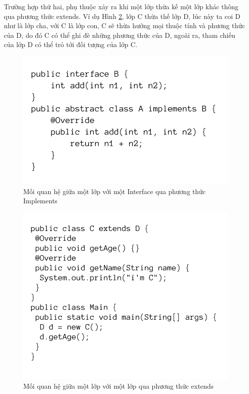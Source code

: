 \documentclass[12pt]{report}
\begin{document}
\noindent Trường hợp thứ hai, phụ thuộc xảy ra khi một lớp thừa kế một lớp khác thông qua phương thức extends. Ví dụ Hình \ref{fig:CextendD}, lớp C thừa thế lớp D, lúc này ta coi D như là lớp cha, với C là lớp con, C sẽ thừa hưởng mọi thuộc tính và phương thức của  D, do đó C có thể ghi đè những phương thức của D, ngoài ra, tham chiếu của lớp D có thể trỏ tới đối tượng của lớp C.
\begin{figure}[!htbp]
	\centering
	\includegraphics[scale=0.36]{images/AimplementsB}
	\caption{Mối quan hệ giữa một lớp với một Interface qua phương thức Implements}
	\label{fig:A_implemets_B}
\end{figure}
\begin{figure}[!htbp]
	\centering
	\includegraphics[scale=0.36]{images/CextendD}
	\caption{Mối quan hệ giữa một lớp với một lớp qua phương thức extends}
	\label{fig:CextendD}
\end{figure}
\end{document}
